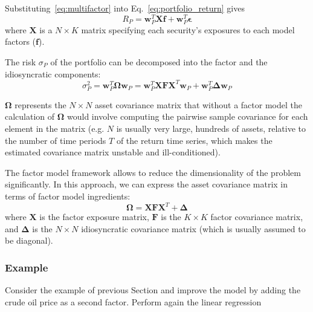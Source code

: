 Substituting~\ref{eq:multifactor} into Eq.~\ref{eq:portfolio_return} gives
\begin{equation}
R_P = \mathbf{w}^T_P \mathbf{Xf} + \mathbf{w}^T_P\boldsymbol{\epsilon}
\end{equation}
where $\mathbf{X}$ is a $N\times K$ matrix specifying each security’s exposures to each model factors ($\mathbf{f}$). 

The risk $\sigma_P$ of the portfolio can be decomposed into the factor and the idiosyncratic components: 
\begin{equation}
\sigma^2_P = \mathbf{w}_P^T\mathbf{\Omega}\mathbf{w}_P = \mathbf{w}_P^T \mathbf{XFX}^T \mathbf{w}_P + \mathbf{w}_P^T \mathbf{\Delta} \mathbf{w}_P
\end{equation}

$\mathbf{\Omega}$ represents the $N \times N$ asset covariance matrix that without a factor model the calculation of $\mathbf{\Omega}$ would involve computing the pairwise sample covariance for each element in the matrix (e.g. $N$ is usually very large, hundreds of assets, relative to the number of time periods $T$ of the return time series, which makes the estimated covariance matrix unstable and ill-conditioned).

The factor model framework allows to reduce the dimensionality of the problem significantly. In this approach, we can express the asset covariance matrix in terms of factor model ingredients:
\begin{equation}
\mathbf{\Omega} = \mathbf{XFX}^T + \mathbf{\Delta}
\end{equation}
where $\mathbf{X}$ is the factor exposure matrix, $\mathbf{F}$ is the $K\times K$ factor covariance matrix, and $\mathbf{\Delta}$ is the $N\times N$ idiosyncratic covariance matrix (which is usually assumed to be diagonal). 

\subsubsection{Example}

Consider the example of previous Section and improve the model by adding the crude oil price as a second factor. Perform again the linear regression

